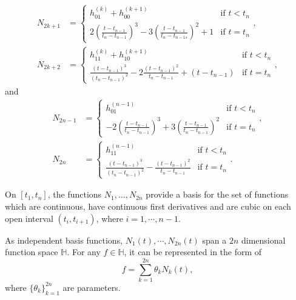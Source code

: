 \begin{align}
N_{2k+1}&=
\begin{cases}
h_{01}^{(k)}+h_{00}^{(k+1)} & \mbox{if $t<t_n$}\\
2(\frac{t-t_{n-1}}{t_{n}-t_{n-1}})^3-3(\frac{t-t_{n-1}}{t_{n}-t_{n-1s}})^2+1 &  \mbox{if $t=t_n$}
\end{cases},\\
N_{2k+2}&=
\begin{cases}
 h_{11}^{(k)}+h_{10}^{(k+1)} & \mbox{if $t<t_n$}\\
\frac{(t-t_{n-1})^3}{(t_{n}-t_{n-1})^2}-2\frac{(t-t_{n-1})^2}{t_{n}-t_{n-1}}+(t-t_{n-1}) & \mbox{if $t=t_n$}
\end{cases},
\end{align}
and
\begin{align}
N_{2n-1} &= 
\begin{cases}
h_{01}^{(n-1)} & \mbox{if $t<t_n$}\\ 
-2(\frac{t-t_{n-1}}{t_{n}-t_{n-1}})^3+3(\frac{t-t_{n-1}}{t_{n}-t_{n-1}})^2 & \mbox{if $t=t_n$}
\end{cases},\\
N_{2n} &= 
\begin{cases}
h_{11}^{(n-1)} & \mbox{if $t<t_n$}\\
\frac{(t-t_{n-1})^3}{(t_{n}-t_{n-1})^2}-\frac{(t-t_{n-1})^2}{t_{n}-t_{n-1}} & \mbox{if $t=t_n$}
\end{cases}.
\end{align}

\begin{theorem}\label{basisindependent}
On $[t_1,t_n]$, the functions $N_1,\ldots,N_{2n}$ provide a basis for the set of functions which are continuous, have continuous first derivatives and are 
cubic on each open interval $(t_i,t_{i+1})$, where $i=1, \cdots, n-1$.
\end{theorem}
As independent basis functions, $N_1(t), \cdots, N_{2n}(t)$ span a $2n$ dimensional function space $\mathbb{H}$. For any $f \in \mathbb{H}$, it can be represented in the form of
\begin{equation}
f=\sum_{k=1}^{2n} \theta_k N_k(t),
\end{equation}
where $\{\theta_k\}_{k=1}^{2n}$ are parameters.

